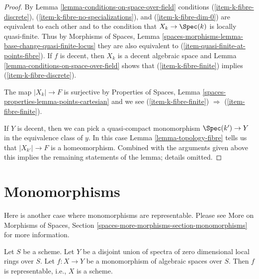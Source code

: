\begin{proof}
By Lemma \ref{lemma-conditions-on-space-over-field}
conditions  (\ref{item-k-fibre-discrete}),
(\ref{item-k-fibre-no-specializations}), and (\ref{item-k-fibre-dim-0})
are equivalent to each other and to the condition that
$X_k \to \Spec(k)$ is locally quasi-finite.
Thus by Morphisms of Spaces, Lemma
\ref{spaces-morphisms-lemma-base-change-quasi-finite-locus}
they are also equivalent to (\ref{item-quasi-finite-at-points-fibre}).
If $f$ is decent, then $X_k$ is a decent algebraic space and
Lemma \ref{lemma-conditions-on-space-over-field}
shows that (\ref{item-k-fibre-finite}) implies (\ref{item-k-fibre-discrete}).

\medskip\noindent
The map $|X_k| \to F$ is surjective by
Properties of Spaces, Lemma \ref{spaces-properties-lemma-points-cartesian}
and we see
(\ref{item-k-fibre-finite}) $\Rightarrow$ (\ref{item-fibre-finite}).

\medskip\noindent
If $Y$ is decent, then we can pick a quasi-compact monomorphism
$\Spec(k') \to Y$ in the equivalence class of $y$. In this case
Lemma \ref{lemma-topology-fibre}
tells us that $|X_{k'}| \to F$ is a homeomorphism.
Combined with the arguments given above this implies
the remaining statements of the lemma; details omitted.
\end{proof}







\section{Monomorphisms}
\label{section-monomorphisms}

\noindent
Here is another case where monomorphisms are representable.
Please see More on Morphisms of Spaces, Section
\ref{spaces-more-morphisms-section-monomorphisms}
for more information.

\begin{lemma}
\label{lemma-monomorphism-toward-disjoint-union-dim-0-rings}
Let $S$ be a scheme. Let $Y$ be a disjoint union of spectra of
zero dimensional local rings over $S$.
Let $f : X \to Y$ be a monomorphism of algebraic spaces over $S$.
Then $f$ is representable, i.e., $X$ is a scheme.
\end{lemma}

